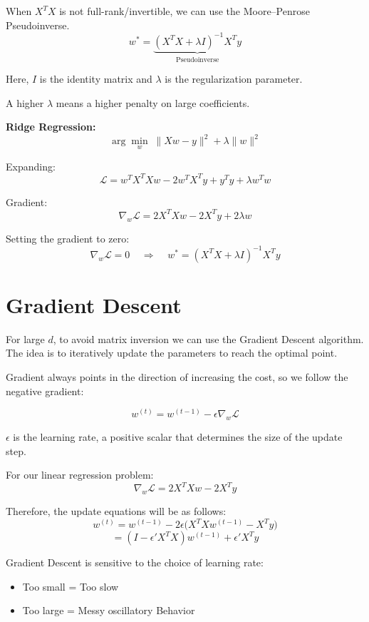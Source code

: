 \documentclass[11pt]{article}
\begin{document}
When $X^T X$ is not full-rank/invertible, we can use the Moore--Penrose Pseudoinverse.
\[
	w^* = \underbrace{(X^T X + \lambda I)^{-1} X^T y}_{\text{Pseudoinverse}}
\]

Here, $I$ is the identity matrix and $\lambda$ is the regularization parameter.

A higher $\lambda$ means a higher penalty on large coefficients.

\bigskip

\textbf{Ridge Regression:}
\[
	\arg\min_w \; \|Xw - y\|^2 + \lambda \|w\|^2
\]

Expanding:
\[
	\mathcal{L} = w^T X^T X w - 2 w^T X^T y + y^T y + \lambda w^T w
\]

Gradient:
\[
	\nabla_w \mathcal{L} = 2X^T X w - 2X^T y + 2\lambda w
\]

Setting the gradient to zero:
\[
	\nabla_w \mathcal{L} = 0 \;\;\;\;\Rightarrow\;\;\;\; w^* = (X^T X + \lambda I)^{-1} X^T y
\]

\section*{Gradient Descent}


For large $d$, to avoid matrix inversion we can use the Gradient Descent algorithm.
The idea is to iteratively update the parameters to reach the optimal point.

\medskip

\noindent Gradient always points in the direction of increasing the cost, so we follow the negative gradient:

\[
	w^{(t)} = w^{(t-1)} - \epsilon \nabla_w \mathcal{L}
\]

$\epsilon$ is the learning rate, a positive scalar that determines the size of the update step.

\pagebreak

For our linear regression problem:
\[
	\nabla_w \mathcal{L} = 2X^T X w - 2X^T y
\]

Therefore, the update equations will be as follows:
\[
	w^{(t)} = w^{(t-1)} - 2\epsilon \big(X^T X w^{(t-1)} - X^T y\big)
\]
\[
	= (I - \epsilon' X^T X) w^{(t-1)} + \epsilon' X^T y
\]

Gradient Descent is sensitive to the choice of learning rate:
\begin{itemize}
	\item Too small = Too slow
	\item Too large = Messy oscillatory Behavior
\end{itemize}
\end{document}
